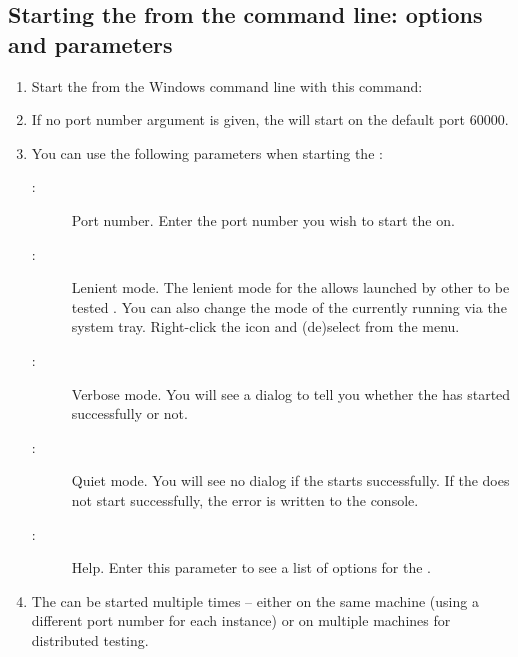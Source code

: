 \subsection{Starting the \gdagent{} from the command line: options and parameters}
\label{tasksagentcmd}
\label{TasksAgentLenient}

\begin{enumerate}
\item Start the \gdagent{} from the Windows command line with this command:\\

\item If no port number argument is given, the \gdagent{}  will start on the default port 60000. 

\item You can use the following parameters when starting the \gdagent{}:

\begin{description}
\item [:]{Port number. Enter the port number you wish to start the \gdagent{} on. }
\item[:]{Lenient mode. The lenient mode for the \gdagent{} allows \gdauts{} launched  by other \gdauts{} to be tested . You can also change the mode of the currently running \gdagent{} via the system tray. Right-click the \gdagent{} icon and (de)select  from the menu.}
\item [:]{Verbose mode. You will see a dialog to tell you whether the \gdagent{} has started successfully or not.}
\item [:]{Quiet mode. You will see no dialog if the \gdagent{} starts successfully. If the \gdagent{} does not start successfully, the error is written to the console.}
\item [:]{Help. Enter this parameter to see a list of options for the \gdagent{}.}
\end{description}

\item The \gdagent{} can be started multiple times -- either on the same machine (using a different port number for each instance) or on multiple machines for distributed testing. 

\end{enumerate}

